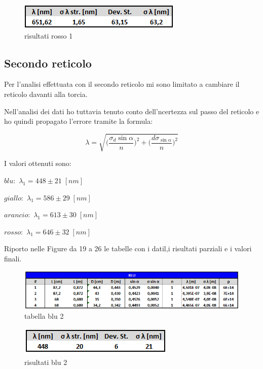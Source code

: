 \documentclass{article}
\begin{document}
\begin{figure}[h!]
  \centering
  \includegraphics[width=0.4\linewidth]{IM risultati rosso 1}
  \caption{risultati rosso 1}
\end{figure}


\pagebreak%
\subsection{Secondo reticolo}
Per l'analisi effettuata con il secondo reticolo mi sono limitato a cambiare il reticolo davanti alla torcia. 

Nell'analisi dei dati ho tuttavia tenuto conto dell'ncertezza sul passo del reticolo e ho quindi propagato l'errore tramite la formula:

\begin{equation}
 \lambda = \sqrt{ \bigg( \frac{\sigma_d \sin \alpha}{n} \bigg)^2 + \bigg( \frac{d \sigma_{\sin \alpha}}{n} \bigg)^2 }
\end{equation}

I valori ottenuti sono:

\begin{centering}
$blu:$ \;\;\;\;\;\; $\lambda_1 = 448 \pm 21\; [nm]$

$giallo:$ \;\; $\lambda_1 = 586 \pm 29\; [nm]$ 

$arancio:$ $\lambda_1 = 613 \pm 30\; [nm]$ 

 $rosso:$ \;\;\; $\lambda_1 = 646 \pm 32\; [nm]$ 

\end{centering}

Riporto nelle Figure da 19 a 26 le tabelle con i datil,i risultati parziali e i valori finali.

\begin{figure}[h!]
  \centering
  \includegraphics[width=1\linewidth]{IM tabella blu 2}
  \caption{tabella blu 2}
\end{figure}

\begin{figure}[h!]
  \centering
  \includegraphics[width=0.4\linewidth]{IM risultati blu 2}
  \caption{risultati blu 2}
\end{figure}
\end{document}
